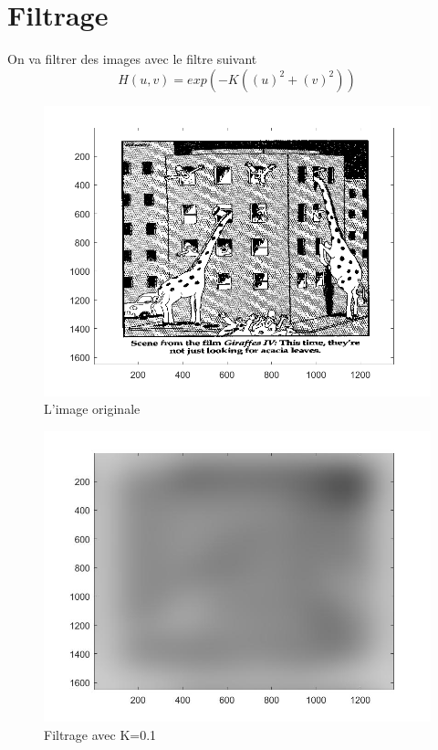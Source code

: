 \documentclass[10pt,a4paper]{article}
\begin{document}
\section{Filtrage}

On va filtrer des images avec le filtre suivant
\[
	H(u,v) = exp(-K((u)^2+(v)^2))
\]
\begin{figure}[H]	\begin{center}
\includegraphics[scale=0.35]{girafe_originale.png}
\caption{L'image originale}
\label{XX}
\end{center}	\end{figure}



\begin{figure}[H]	\begin{center}
\includegraphics[scale=0.35]{imfiltree_k=0.1.jpg}
\caption{Filtrage avec K=0.1}
\label{XX}
\end{center}	\end{figure}
\end{document}
